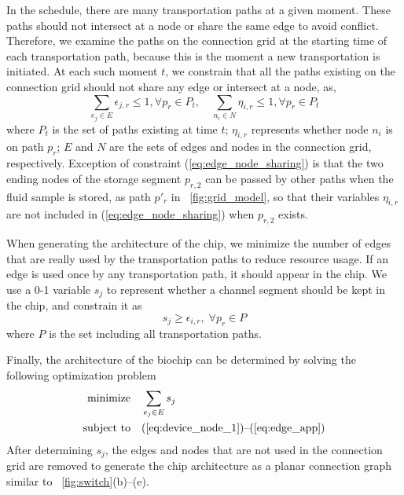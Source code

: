 In the schedule, there are many transportation paths
at a given moment. These paths should not
intersect at a node or share the same edge to avoid conflict.
Therefore, we examine the paths on the connection grid at the starting time of each
transportation path, because this is the moment a new transportation is
initiated. At each such moment $t$, we constrain that all the paths existing on
the connection grid should not share any edge or intersect at a node, as,
\begin{equation}\label{eq:edge_node_sharing}
\sum_{e_j\in E} \epsilon_{j,r}\le 1, \forall p_r\in P_t, \quad
\sum_{n_i\in N} \eta_{i,r}\le 1, \forall  p_r\in P_t
\end{equation}
where $P_t$ is the set of paths existing at time $t$;
$\eta_{i,r}$ represents whether node $n_i$ is on path $p_r$;
$E$ and $N$ are the sets
of edges and nodes in the connection grid, respectively. Exception of
constraint (\ref{eq:edge_node_sharing}) is that the two ending nodes of the
storage segment $p_{r,2}$ can be passed by other paths when the fluid sample is stored,
as path $p'_r$ in \figname~\ref{fig:grid_model}, so that their variables
$\eta_{i,r}$ are not included in (\ref{eq:edge_node_sharing}) when $p_{r,2}$
exists. %

When generating the architecture of the chip, we minimize the number of edges
that are really used by the transportation paths
to reduce resource usage. If an edge is used once by any transportation path,
it should appear in the chip. We use a 0-1 variable $s_j$ to represent whether
a channel segment should be kept in the chip, and constrain it as
\begin{equation}\label {eq:edge_app}
s_j\ge \epsilon_{i,r}, \; \forall p_r\in P
\end{equation}
where $P$ is the set including all transportation paths.

Finally, the architecture of the biochip can be determined by solving the
following optimization problem
\begin{align} \label{eq:edge_opt}
\text{minimize} & \quad \sum_{e_j\in E}s_j\\
\text{subject to} & \quad
\text{(\ref{eq:device_node_1})--(\ref{eq:edge_app})}\label{eq:edge_opt_cond}
\end{align}
After determining $s_j$, the edges and nodes
that are not used in the connection grid
are removed to generate the chip architecture as a planar
connection graph similar to
\figname~\ref{fig:switch}(b)--(e).

